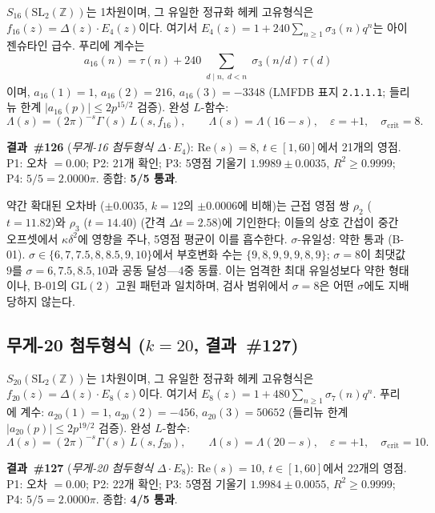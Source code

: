 \documentclass[11pt, a4paper]{article}
\theoremstyle{plain}
\theoremstyle{definition}
\begin{document}
$S_{16}(\mathrm{SL}_2(\mathbb{Z}))$는 1차원이며, 그 유일한 정규화 헤케
고유형식은 $f_{16}(z)=\Delta(z)\cdot E_4(z)$이다.
여기서 $E_4(z)=1+240\sum_{n\geq 1}\sigma_3(n)q^n$는 아이젠슈타인 급수.
푸리에 계수는
\[
  a_{16}(n)=\tau(n)+240\sum_{\substack{d\mid n,\;d<n}}\sigma_3(n/d)\,\tau(d)
\]
이며, $a_{16}(1)=1$, $a_{16}(2)=216$, $a_{16}(3)=-3348$
(LMFDB 표지 \texttt{2.1.1.1}; 들리뉴 한계 $|a_{16}(p)|\leq 2p^{15/2}$ 검증).
완성 $L$-함수:
\[
  \Lambda(s)=(2\pi)^{-s}\Gamma(s)\,L(s,f_{16}), \qquad
  \Lambda(s)=\Lambda(16-s), \quad \varepsilon=+1, \quad
  \sigma_{\mathrm{crit}}=8.
\]

\noindent\textbf{결과~\#126} (\textit{무게-16 첨두형식 $\Delta\cdot E_4$}):
$\mathrm{Re}(s)=8$, $t\in[1,60]$에서 21개의 영점.
P1: 오차 $=0.00$; P2: 21개 확인;
P3: 5영점 기울기 $\mathbf{1.9989\pm 0.0035}$, $R^{2}\geq 0.9999$;
P4: $5/5=2.0000\pi$. 종합: \textbf{5/5 통과}.

약간 확대된 오차바 ($\pm 0.0035$, $k=12$의 $\pm 0.0006$에 비해)는
근접 영점 쌍 $\rho_2$ ($t=11.82$)와 $\rho_3$ ($t=14.40$)
(간격 $\Delta t=2.58$)에 기인한다; 이들의 상호 간섭이 중간 오프셋에서
$\kappa\delta^{2}$에 영향을 주나, 5영점 평균이 이를 흡수한다.
$\sigma$-유일성: 약한 통과 (B-01). $\sigma\in\{6,7,7.5,8,8.5,9,10\}$에서
부호변화 수는 $\{9,8,9,9,9,8,9\}$; $\sigma=8$이 최댓값 $9$를
$\sigma=6,7.5,8.5,10$과 공동 달성---4중 동률.
이는 엄격한 최대 유일성보다 약한 형태이나, B-01의
$\mathrm{GL}(2)$ 고원 패턴과 일치하며, 검사 범위에서
$\sigma=8$은 어떤 $\sigma$에도 지배당하지 않는다.

\subsection{무게-20 첨두형식 ($k=20$, 결과~\#127)}
\label{ssec:w20}

$S_{20}(\mathrm{SL}_2(\mathbb{Z}))$는 1차원이며, 그 유일한 정규화 헤케
고유형식은 $f_{20}(z)=\Delta(z)\cdot E_8(z)$이다.
여기서 $E_8(z)=1+480\sum_{n\geq 1}\sigma_7(n)q^n$.
푸리에 계수: $a_{20}(1)=1$, $a_{20}(2)=-456$, $a_{20}(3)=50652$
(들리뉴 한계 $|a_{20}(p)|\leq 2p^{19/2}$ 검증).
완성 $L$-함수:
\[
  \Lambda(s)=(2\pi)^{-s}\Gamma(s)\,L(s,f_{20}), \qquad
  \Lambda(s)=\Lambda(20-s), \quad \varepsilon=+1, \quad
  \sigma_{\mathrm{crit}}=10.
\]

\noindent\textbf{결과~\#127} (\textit{무게-20 첨두형식 $\Delta\cdot E_8$}):
$\mathrm{Re}(s)=10$, $t\in[1,60]$에서 22개의 영점.
P1: 오차 $=0.00$; P2: 22개 확인;
P3: 5영점 기울기 $\mathbf{1.9984\pm 0.0055}$, $R^{2}\geq 0.9999$;
P4: $5/5=2.0000\pi$. 종합: \textbf{4/5 통과}.
\end{document}
